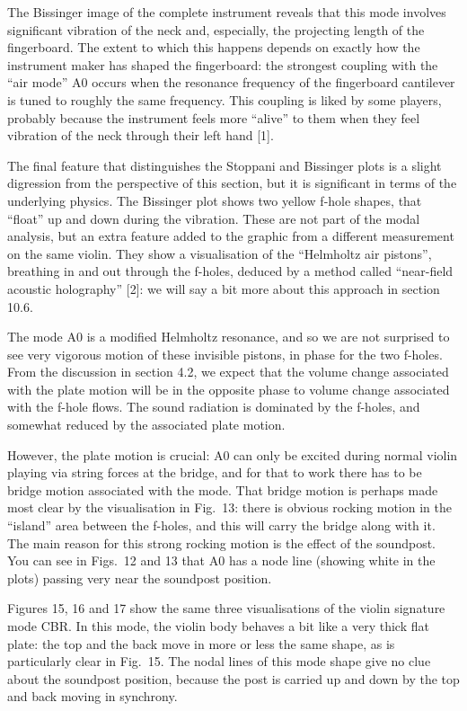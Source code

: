   The Bissinger image of the complete instrument reveals that this mode 
  involves significant vibration of the neck and, especially, the projecting 
  length of the fingerboard. The extent to which this happens depends on 
  exactly how the instrument maker has shaped the fingerboard: the strongest 
  coupling with the “air mode” A0 occurs when the resonance frequency of the 
  fingerboard cantilever is tuned to roughly the same frequency. This coupling 
  is liked by some players, probably because the instrument feels more “alive” 
  to them when they feel vibration of the neck through their left hand [1]. 

  The final feature that distinguishes the Stoppani and Bissinger plots is a 
  slight digression from the perspective of this section, but it is significant 
  in terms of the underlying physics. The Bissinger plot shows two yellow 
  f-hole shapes, that “float” up and down during the vibration. These are not 
  part of the modal analysis, but an extra feature added to the graphic from a 
  different measurement on the same violin. They show a visualisation of the 
  “Helmholtz air pistons”, breathing in and out through the f-holes, deduced by 
  a method called “near-field acoustic holography” [2]: we will say a bit more 
  about this approach in section 10.6. 

  The mode A0 is a modified Helmholtz resonance, and so we are not surprised to 
  see very vigorous motion of these invisible pistons, in phase for the two 
  f-holes. From the discussion in section 4.2, we expect that the volume change 
  associated with the plate motion will be in the opposite phase to volume 
  change associated with the f-hole flows. The sound radiation is dominated by 
  the f-holes, and somewhat reduced by the associated plate motion. 

  However, the plate motion is crucial: A0 can only be excited during normal 
  violin playing via string forces at the bridge, and for that to work there 
  has to be bridge motion associated with the mode. That bridge motion is 
  perhaps made most clear by the visualisation in Fig.\ 13: there is obvious 
  rocking motion in the “island” area between the f-holes, and this will carry 
  the bridge along with it. The main reason for this strong rocking motion is 
  the effect of the soundpost. You can see in Figs.\ 12 and 13 that A0 has a 
  node line (showing white in the plots) passing very near the soundpost 
  position. 

  Figures 15, 16 and 17 show the same three visualisations of the violin 
  signature mode CBR. In this mode, the violin body behaves a bit like a very 
  thick flat plate: the top and the back move in more or less the same shape, 
  as is particularly clear in Fig.\ 15. The nodal lines of this mode shape give 
  no clue about the soundpost position, because the post is carried up and down 
  by the top and back moving in synchrony. 

